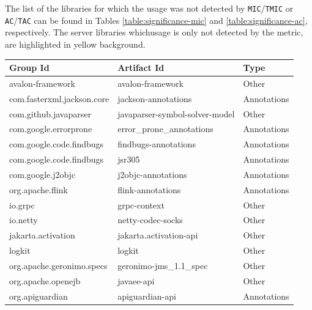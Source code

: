 The list of the libraries for which the usage was not detected by \texttt{MIC}/\texttt{TMIC} or \texttt{AC}/\texttt{TAC} can be found in Tables \ref{table:significance-mic} and \ref{table:significance-ac}, respectively. The server libraries whichusage is only not detected by the metric, are highlighted in yellow background.

\begin{table}[ht]
\begin{center}
\begin{tabular}{|l|l|l|}
\hline
\textbf{Group Id} & \textbf{Artifact Id} & \textbf{Type} \\
\hline
avalon-framework            & avalon-framework                & Other       \\\hline %
com.fasterxml.jackson.core  & jackson-annotations             & Annotations \\\hline
com.github.javaparser       & javaparser-symbol-solver-model  & Other       \\\hline
com.google.errorprone       & error\_prone\_annotations       & Annotations \\\hline
com.google.code.findbugs    & findbugs-annotations            & Annotations \\\hline
com.google.code.findbugs    & jsr305                          & Annotations \\\hline
com.google.j2objc           & j2objc-annotations              & Annotations \\\hline
org.apache.flink            & flink-annotations               & Annotations \\\hline
io.grpc                     & grpc-context                    & Other       \\\hline
io.netty                    & netty-codec-socks               & Other       \\\hline
jakarta.activation          & jakarta.activation-api          & Other       \\\hline
logkit                      & logkit                          & Other       \\\hline %
org.apache.geronimo.specs   & geronimo-jms\_1.1\_spec         & Other       \\\hline %
org.apache.openejb          & javaee-api                      & Other       \\\hline %
org.apiguardian             & apiguardian-api                 & Annotations \\\hline

\end{tabular}
\end{center}
\end{table}
